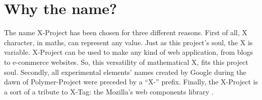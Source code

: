 \section{Why the name?}
\label{sec:XPR_name}

The name X-Project has been chosen for three different reasons.
First of all, X character, in maths, can represent any value. Just as this project's soul, the X is variable. X-Project can be used to make any kind of web application, from blogs to e-commerce websites.
So, this versatility of mathematical X, fits this project soul.
Secondly, all experimental elements' names created by Google during the dawn of Polymer-Project were preceded by a ``X-'' prefix.
Finally, the X-Project is a sort of a tribute to X-Tag: the Mozilla's web components library \cite{xtag}.
